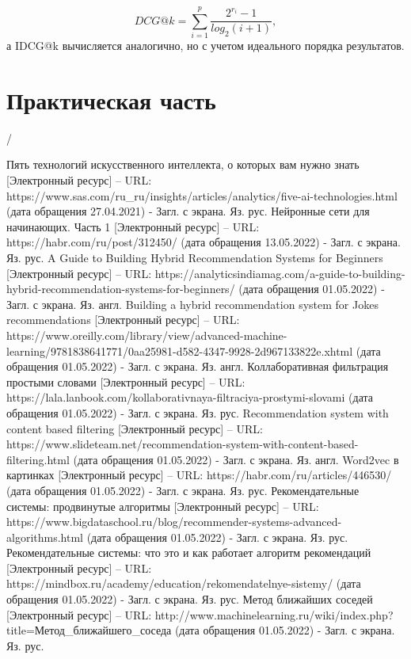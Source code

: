 \documentclass[bachelor, och, coursework]{SCWorks}
\begin{document}
\begin{equation}
    DCG@k = \sum_{i=1}^p\frac{2^{r_i} - 1}{log_2(i+1)},
\end{equation}
а IDCG@k вычисляется аналогично, но с учетом идеального порядка результатов.
\section{Практическая часть}
\conclusion 
/
\begin{thebibliography}{99}
    Пять технологий искусственного интеллекта, о которых вам нужно знать [Электронный ресурс] – URL: https://www.sas.com/ru_ru/insights/articles/analytics/five-ai-technologies.html (дата обращения 27.04.2021) - Загл. с экрана. Яз. рус.
    Нейронные сети для начинающих. Часть 1 [Электронный ресурс] – URL: https://habr.com/ru/post/312450/ (дата обращения 13.05.2022) - Загл. с экрана. Яз. рус.
    A Guide to Building Hybrid Recommendation Systems for Beginners [Электронный ресурс] – URL: https://analyticsindiamag.com/a-guide-to-building-hybrid-recommendation-systems-for-beginners/ (дата обращения 01.05.2022) - Загл. с экрана. Яз. англ.
    Building a hybrid recommendation system for Jokes recommendations [Электронный ресурс] – URL: https://www.oreilly.com/library/view/advanced-machine-learning/9781838641771/0aa25981-d582-4347-9928-2d967133822e.xhtml (дата обращения 01.05.2022) - Загл. с экрана. Яз. англ.
    Коллаборативная фильтрация простыми словами [Электронный ресурс] – URL: https://lala.lanbook.com/kollaborativnaya-filtraciya-prostymi-slovami (дата обращения 01.05.2022) - Загл. с экрана. Яз. рус.
    Recommendation system with content based filtering [Электронный ресурс] – URL: https://www.slideteam.net/recommendation-system-with-content-based-filtering.html (дата обращения 01.05.2022) - Загл. с экрана. Яз. англ.
    Word2vec в картинках [Электронный ресурс] – URL: https://habr.com/ru/articles/446530/ (дата обращения 01.05.2022) - Загл. с экрана. Яз. рус.
    Рекомендательные системы: продвинутые алгоритмы [Электронный ресурс] – URL: https://www.bigdataschool.ru/blog/recommender-systems-advanced-algorithms.html (дата обращения 01.05.2022) - Загл. с экрана. Яз. рус.
    Рекомендательные системы: что это и как работает алгоритм рекомендаций [Электронный ресурс] – URL: https://mindbox.ru/academy/education/rekomendatelnye-sistemy/ (дата обращения 01.05.2022) - Загл. с экрана. Яз. рус.
    Метод ближайших соседей [Электронный ресурс] – URL: http://www.machinelearning.ru/wiki/index.php?title=Метод_ближайшего_соседа (дата обращения 01.05.2022) - Загл. с экрана. Яз. рус.

\end{thebibliography}
\end{document}
